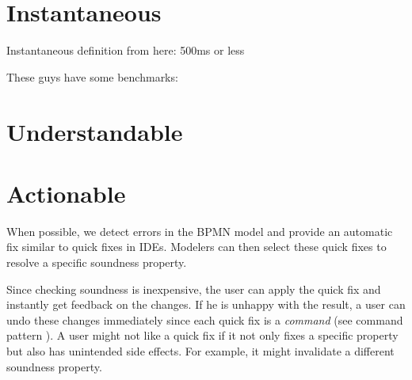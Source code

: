 \documentclass[runningheads]{llncs}
\begin{document}
\cite{corradiniClassificationBPMNCollaborations2018}


\section{Instantaneous}
Instantaneous definition from here: \cite{fahlandAnalysisDemandInstantaneous2011}
500ms or less


These guys have some benchmarks:
\cite{corradiniFormalApproachAnalysis2021}

\section{Understandable}

\cite{camundaservicesgmbhBpmnjsTokenSimulation2024}

\section{Actionable}


When possible, we detect errors in the BPMN model and provide an automatic fix similar to quick fixes in IDEs.
Modelers can then select these quick fixes to resolve a specific soundness property.

Since checking soundness is inexpensive, the user can apply the quick fix and instantly get feedback on the changes.
If he is unhappy with the result, a user can undo these changes immediately since each quick fix is a \textit{command} (see command pattern \cite{gammaDesignPatternsElements1995}).
A user might not like a quick fix if it not only fixes a specific property but also has unintended side effects.
For example, it might invalidate a different soundness property.
\end{document}
